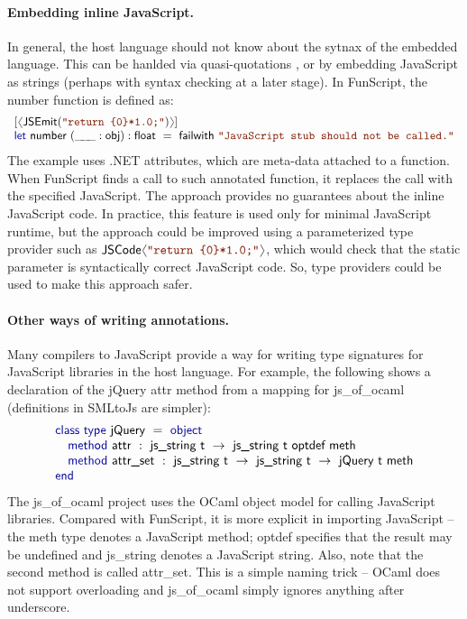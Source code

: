 \documentclass[submission,copyright,creativecommons]{eptcs}
\newcommand{\langl}{\begin{picture}(4.5,7)
\put(1.1,2.5){\rotatebox{60}{\line(1,0){5.5}}}
\put(1.1,2.5){\rotatebox{300}{\line(1,0){5.5}}}
\end{picture}}
\newcommand{\rangl}{\begin{picture}(4.5,7)
\put(.9,2.5){\rotatebox{120}{\line(1,0){5.5}}}
\put(.9,2.5){\rotatebox{240}{\line(1,0){5.5}}}
\end{picture}}
\newcommand{\ignp}{\_\kern-.5ex\_\kern-.5ex\_ }
\newcommand{\kvd}[1]{\textnormal{\textcolor{kvdclr}{\sffamily #1}}}
\newcommand{\str}[1]{\textnormal{\textcolor{strclr}{\ttfamily "#1"}}}
\newcommand{\ident}[1]{\textnormal{\sffamily #1}}
\begin{document}
\paragraph{Embedding inline JavaScript.}
In general, the host language should not know about the sytnax of the embedded language. This can
be hanlded via quasi-quotations \cite{haskell-templ}, or by embedding JavaScript as strings (perhaps
with syntax checking at a later stage). In FunScript, the \ident{number} function is defined as:
%
\begin{equation*}
\begin{array}{l}
 \lbrack\langl\ident{JSEmit}(\str{return \{0\}*1.0;})\rangl\rbrack \\
 \kvd{let}~\ident{number}~(\ignp:\ident{obj}) : \ident{float} ~=~\ident{failwith}~\str{JavaScript stub should not be called.}
\end{array}
\end{equation*}
%
The example uses .NET attributes, which are meta-data attached to a function. When FunScript finds
a call to such annotated function, it replaces the call with the specified JavaScript.
The approach provides no guarantees about the inline JavaScript code. In practice, this feature
is used only for minimal JavaScript runtime, but the approach could be improved using a
parameterized type provider such as $\ident{JSCode}\langl\str{return \{0\}*1.0;}\rangl$, which
would check that the static parameter is syntactically correct JavaScript code. So, type providers
could be used to make this approach safer.

\vspace{-1em}
\paragraph{Other ways of writing annotations.}
Many compilers to JavaScript provide a way for writing type signatures for JavaScript
libraries in the host language. For example, the following shows a declaration of the
jQuery \ident{attr} method from a mapping for js\_of\_ocaml \cite{js_ocmal} (definitions in
SMLtoJs \cite{js_sml} are simpler):
%
\begin{equation*}
\begin{array}{l}
 \kvd{class type}~\ident{jQuery}~=~\kvd{object} \\
 \quad \kvd{method}~\ident{attr}~:~\ident{js\_string t} ~\rightarrow~ \ident{js\_string t optdef meth} \\
 \quad \kvd{method}~\ident{attr\_set}~:~\ident{js\_string t} ~\rightarrow~ \ident{js\_string t} ~\rightarrow~ \ident{jQuery t meth} \\
 \kvd{end}
\end{array}
\end{equation*}
%
The js\_of\_ocaml project uses the OCaml object model for calling JavaScript libraries.
Compared with FunScript, it is more explicit in importing JavaScript -- the \ident{meth}
type denotes a JavaScript method; \ident{optdef} specifies that the result may be
undefined and \ident{js\_string} denotes a JavaScript string. Also, note that the second method
is called \ident{attr\_set}. This is a simple naming trick -- OCaml does not support overloading
and js\_of\_ocaml simply ignores anything after underscore.
\end{document}
